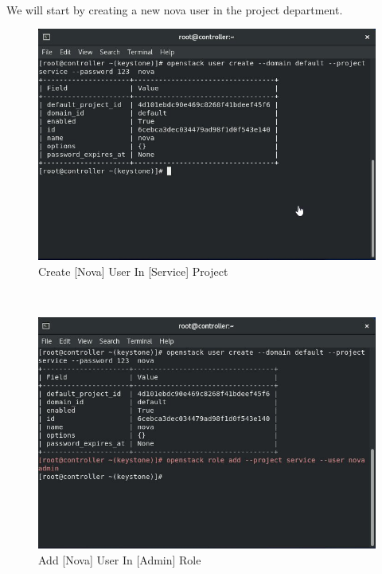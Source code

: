 \begin{spacing}{1.2}
\\
\par We will start by creating a new nova user in the project department. 
\begin{figure}[!htb] 
\begin{center} 
\includegraphics[width=1\linewidth]{Cloud/Nova Setup in Keystone/Create [Nova] User In [Service] Project} 
\end{center} 
\caption{Create [Nova] User In [Service] Project} 
\end{figure}  \FloatBarrier 
\\
\begin{figure}[!htb] 
\begin{center} 
\includegraphics[width=1\linewidth]{Cloud/Nova Setup in Keystone/Add [Nova] User In [Admin] Role} 
\end{center} 
\caption{Add [Nova] User In [Admin] Role} 
\end{figure}  \FloatBarrier 
\\


\end{spacing}
